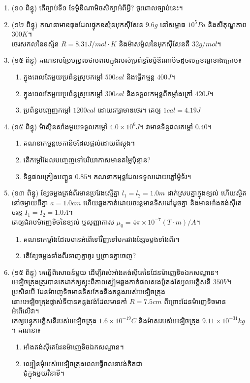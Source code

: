 \documentclass{officialexam}
\begin{document}
\begin{enumerate}[m]
	\item (១០ ពិន្ទុ) តើច្បាប់ទី១ ទែម៉ូឌីណាមិចសិក្សាអំពីអ្វី? ចូរពោលច្បាប់នេះ។
	\item (១២ ពិន្ទុ) គណនាមាឌធុងដែលផ្ទុកឧស្ម័នអុកសុីសែន $9.6g$ នៅសម្ពាធ $10^{5}Pa$ និងសីតុណ្ហភាព $300K$។ \\ថេរសកលនៃឧស្ម័ន $R=8.31J/mol\cdot K$ និងម៉ាសម៉ូលនៃអុកសុីសែនគឺ $32g/mol$។
	\item (១៥ ពិន្ទុ) គណនាបម្រែបម្រួលថាមពលក្នុងរបស់ប្រព័ន្ធទែម៉ូឌីណាមិចដូចលក្ខខណ្ឌខាងក្រោម៖
	\begin{enumerate}[k]
		\item ក្នុងពេលតែមួយប្រព័ន្ធស្រូបកម្តៅ $500cal$ និងធ្វើកម្មន្ត $400J$។
		\item ក្នុងពេលតែមួយប្រព័ន្ធស្រូបកម្តៅ $300cal$ និងទទួលកម្មន្តពីកម្លាំងក្រៅ $420J$។
		\item ប្រព័ន្ធបញ្ចេញកម្តៅ $1200cal$ ដោយរក្សាមាឌថេរ។ គេឲ្យ $1cal=4.19J$
	\end{enumerate}
	\item (១៥ ពិន្ទុ) ម៉ាសុីនសាំងមួយទទួលកម្តៅ $4.0\times 10^{6}J$។ វាមានទិន្នផលកម្តៅ $0.40$។
		\begin{enumerate}[k]
			\item គណនាកម្នន្តមេកានិចដែលផ្តល់ដោយពីស្តុង។
			\item តើកម្តៅដែលបញ្ចេញទៅបរិយាកាសមានតម្លៃប៉ុន្មាន?
			\item ទិន្នផលគ្រឿងបញ្ជួន $0.85$។ គណនាកម្មន្តដែលទទួលដោយភ្លៅម៉ូទ័រ។
		\end{enumerate}
	\item (១៣ ពិន្ទុ) ខ្សែចម្លងត្រង់ពីរមានប្រវែងស្មើគ្នា $l_1=l_2=1.0m$ ដាក់ស្របគ្នាក្នុងខ្យល់ ហើយស្ថិតនៅចម្ងាយពីគ្នា $a=1.0cm$ ហើយឆ្លងកាត់ដោយចរន្តមានទិសដៅដូចគ្នា និងមានអាំងតង់សុីតេចរន្ត $I_1=I_2=1.0A$។ \\គេឲ្យជំរាបម៉ាញេទិចនៃខ្យល់ ឬសុញ្ញាកាស $\mu_0=4\pi\times10^{-7}\left(T\cdot m\right)/A$។
	\begin{enumerate}[k]
		\item គណនាកម្លាំងដែលមានអំពើទៅវិញទៅមករវាងខ្សែចម្លងទាំងពីរ។
		\item តើខ្សែចម្លងទាំងពីរទាញគ្នាចូរ ឬច្រានគ្នាចេញ?
	\end{enumerate}
	\item (១៥ ពិន្ទុ) គេធ្វើពិសោធន៍មួយ ដើម្បីវាស់អាំងតង់សុីតេនៃដែនម៉ាញេទិចឯកសណ្ឋាន។ អេឡិចត្រុងត្រូវបានគេដាក់ឲ្យស្ទុះពីភាពស្ងៀមឆ្លងកាត់ផលសងប៉ូតង់ស្យែលអគ្គិសនី $350V$។ ប្រសិនបើ ដែនម៉ាញេទិចមានទិសកែងនឹងគន្លងរបស់អេឡិចត្រុង\\ នោះអេឡិចត្រុងផ្លាស់ទីបានគន្លងវង់ដែលមានកាំ $R=7.5cm$ ពីព្រោះដែនម៉ាញេទិចមានអំពើលើវា។ \\គេឲ្យបន្ទុកអគ្គិសនីរបស់អេឡិចត្រុង $1.6\times10^{-19}C$ និងម៉ាសរបស់អេឡិចត្រុង $9.11\times10^{-31}kg$។ គណនា៖
	\begin{enumerate}[k,2]
		\item អាំងតង់សុីតេដែនម៉ាញេទិចឯកសណ្ឋាន។
		\item ល្បឿនមុំរបស់អេឡិចត្រុងពេលធ្វើចលនាវង់គិតជា\\ ជុំក្នុងមួយវិនាទី។
	\end{enumerate} 
\end{enumerate}
\end{document}

